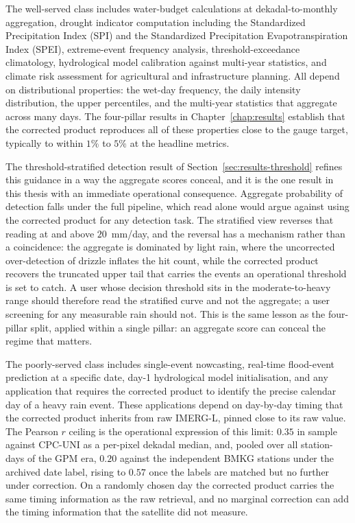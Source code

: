 The well-served class includes water-budget calculations at
dekadal-to-monthly aggregation, drought indicator computation
including the Standardized Precipitation Index (SPI) and the
Standardized Precipitation Evapotranspiration Index (SPEI),
extreme-event frequency analysis, threshold-exceedance
climatology, hydrological model calibration against multi-year
statistics, and climate risk assessment for agricultural and
infrastructure planning. All depend on distributional properties:
the wet-day frequency, the daily intensity distribution, the
upper percentiles, and the multi-year statistics that aggregate
across many days. The four-pillar results in
Chapter~\ref{chap:results} establish that the corrected product
reproduces all of these properties close to the gauge target,
typically to within $1\%$ to $5\%$ at the headline metrics.

The threshold-stratified detection result of
Section~\ref{sec:results-threshold} refines this guidance in a way
the aggregate scores conceal, and it is the one result in this
thesis with an immediate operational consequence. Aggregate
probability of detection falls under the full pipeline, which read
alone would argue against using the corrected product for any
detection task. The stratified view reverses that reading at and
above $20$~mm/day, and the reversal has a mechanism rather than a
coincidence: the aggregate is dominated by light rain, where the
uncorrected over-detection of drizzle inflates the hit count, while
the corrected product recovers the truncated upper tail that carries
the events an operational threshold is set to catch. A user whose
decision threshold sits in the moderate-to-heavy range should
therefore read the stratified curve and not the aggregate; a user
screening for any measurable rain should not. This is the same
lesson as the four-pillar split, applied within a single pillar:
an aggregate score can conceal the regime that matters.

The poorly-served class includes single-event nowcasting,
real-time flood-event prediction at a specific date, day-1
hydrological model initialisation, and any application that
requires the corrected product to identify the precise calendar
day of a heavy rain event. These applications depend on
day-by-day timing that the corrected product inherits from raw
IMERG-L, pinned close to its raw value. The Pearson $r$ ceiling is
the operational expression of this limit: $0.35$ in sample against
CPC-UNI as a per-pixel dekadal median, and, pooled over all
station-days of the GPM era, $0.20$ against the independent BMKG
stations under the archived date label, rising to $0.57$ once the
labels are matched but no further under correction. On a randomly chosen day
the corrected product carries the same timing information as the
raw retrieval, and no marginal correction can add the timing
information that the satellite did not measure.

